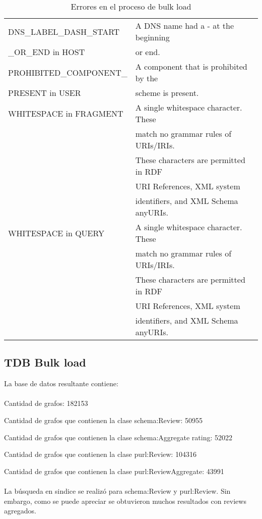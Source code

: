 \begin{table}[h]
\begin{tabular}{| l | l | }
DNS\_LABEL\_DASH\_START& A DNS name had a - at the beginning \\ \_OR\_END in HOST  & or end.\\\hline
PROHIBITED\_COMPONENT\_& A component that is prohibited by the \\ PRESENT in USER  & scheme is present.\\\hline
WHITESPACE in FRAGMENT & A single whitespace character. These \\ & match no grammar  rules of URIs/IRIs. \\ & These characters are permitted in RDF \\ & URI References, XML system \\ & identifiers, and XML Schema anyURIs.\\\hline
WHITESPACE in QUERY &A single whitespace character. These \\ & match no grammar  rules of URIs/IRIs. \\ & These characters are permitted in RDF \\ & URI References, XML system \\ & identifiers, and XML Schema anyURIs.\\\hline
\end{tabular}
\caption{Errores en el proceso de bulk load}
\label{table:BulkLoadErrors}
\end{table}

\subsection{TDB Bulk load}

La base de datos resultante contiene:
\\\\
Cantidad de grafos: 182153

\noindent Cantidad de grafos que contienen la clase schema:Review: 50955 

\noindent Cantidad de grafos que contienen la clase schema:Aggregate rating: 52022

\noindent Cantidad de grafos que contienen la clase purl:Review: 104316 

\noindent Cantidad de grafos que contienen la clase purl:ReviewAggregate: 43991
\\\\
La búsqueda en sindice se realizó para schema:Review y purl:Review. Sin embargo, como se puede apreciar se obtuvieron muchos resultados con reviews agregados.
